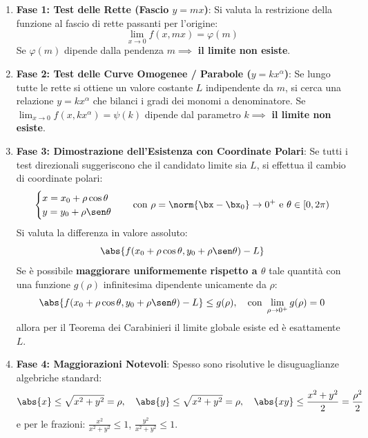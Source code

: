 \begin{metodo}
\begin{enumerate}
    \item \textbf{Fase 1: Test delle Rette (Fascio $y = mx$)}:
    Si valuta la restrizione della funzione al fascio di rette passanti per l'origine:
    \[
    \lim_{x \to 0} f(x, mx) = \varphi(m)
    \]
    Se $\varphi(m)$ dipende dalla pendenza $m \implies$ \textbf{il limite non esiste}.
    
    \item \textbf{Fase 2: Test delle Curve Omogenee / Parabole ($y = k x^\alpha$)}:
    Se lungo tutte le rette si ottiene un valore costante $L$ indipendente da $m$, si cerca una relazione $y = k x^\alpha$ che bilanci i gradi dei monomi a denominatore.
    Se $\lim_{x \to 0} f(x, k x^\alpha) = \psi(k)$ dipende dal parametro $k \implies$ \textbf{il limite non esiste}.
    
    \item \textbf{Fase 3: Dimostrazione dell'Esistenza con Coordinate Polari}:
    Se tutti i test direzionali suggeriscono che il candidato limite sia $L$, si effettua il cambio di coordinate polari:
    \[
    \begin{cases} x = x_0 + \rho \cos\theta \\ y = y_0 + \rho \sen\theta \end{cases} \quad \text{con } \rho = \norm{\bx - \bx_0} \to 0^+ \text{ e } \theta \in [0, 2\pi)
    \]
    Si valuta la differenza in valore assoluto:
    \[
    \abs{f(x_0+\rho\cos\theta, y_0+\rho\sen\theta) - L}
    \]
    Se è possibile \textbf{maggiorare uniformemente rispetto a $\theta$} tale quantità con una funzione $g(\rho)$ infinitesima dipendente unicamente da $\rho$:
    \[
    \abs{f(x_0+\rho\cos\theta, y_0+\rho\sen\theta) - L} \le g(\rho), \quad \text{con } \lim_{\rho \to 0^+} g(\rho) = 0
    \]
    allora per il Teorema dei Carabinieri il limite globale esiste ed è esattamente $L$.
    
    \item \textbf{Fase 4: Maggiorazioni Notevoli}:
    Spesso sono risolutive le disuguaglianze algebriche standard:
    \[
    \abs{x} \le \sqrt{x^2+y^2} = \rho, \quad \abs{y} \le \sqrt{x^2+y^2} = \rho, \quad \abs{xy} \le \frac{x^2+y^2}{2} = \frac{\rho^2}{2}
    \]
    e per le frazioni: $\frac{x^2}{x^2+y^2} \le 1$, $\frac{y^2}{x^2+y^2} \le 1$.
\end{enumerate}
\end{metodo}

